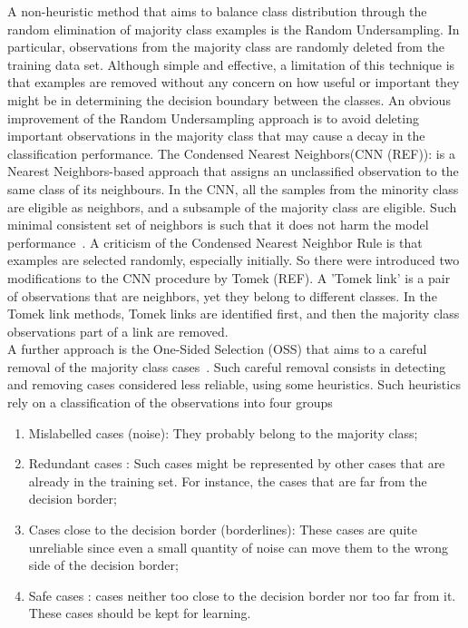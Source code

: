 A non-heuristic method that aims to balance class distribution through the random elimination of majority class examples is the Random Undersampling. In particular,
observations from the majority class are randomly deleted from the training data set. Although simple and effective, a limitation of this technique is that examples are removed without any concern on how useful or important they might be in determining the decision boundary between the classes.
An obvious improvement of the Random Undersampling approach is to avoid deleting important observations in the majority class that may cause a decay in the classification performance. The Condensed Nearest Neighbors(CNN (REF)): is a Nearest Neighbors-based approach that assigns an unclassified observation to the same class of its neighbours. In the CNN, all the samples from the minority class are eligible as neighbors, and a subsample of the majority class are eligible. Such  minimal consistent set of neighbors is such that it does not harm the model performance~\cite{gowda1979condensed}. A criticism of the Condensed Nearest Neighbor Rule is that examples are selected randomly, especially initially. So there were introduced two modifications to the CNN procedure by Tomek (REF). 
A 'Tomek link' is a pair of observations that  are neighbors, yet they belong to different classes. In the Tomek link methods,  Tomek links are identified first, and then the majority class observations part of a link are removed.\\
\noindent
A further approach is the One-Sided Selection (OSS) that aims to a careful removal of the majority class cases~\cite{batista2000applying}.
Such careful removal consists in detecting and removing cases considered less reliable, using some heuristics. Such heuristics rely on a classification of the observations into four groups
\begin{enumerate}
    \item{Mislabelled cases (noise): They probably belong to the majority class;}
    \item{Redundant cases : Such cases might be represented by other cases that are already in the training set. For instance, the cases that are far from the decision border;}
    \item{Cases close to the decision border (borderlines): These cases are quite unreliable since even a small quantity of noise can move them to the wrong side of the decision border;}
    \item{Safe cases :  cases  neither too close to the decision border nor  too far from it. These cases should be kept for learning.}
\end{enumerate}
